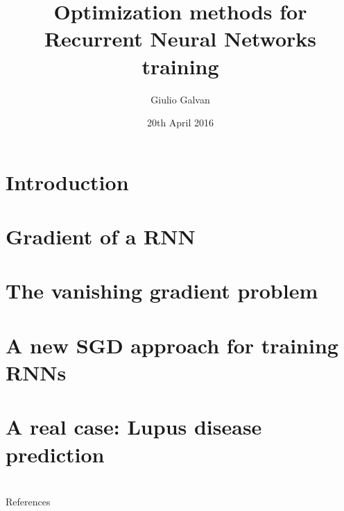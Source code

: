 \documentclass[xcolor=dvipsnames,10pt]{beamer}
\title{Optimization methods for Recurrent Neural Networks training}
\date{20th April 2016}
\author{Giulio Galvan}
\institute{Università degli studi di Firenze}
\begin{document}
\maketitle
\section{Introduction}

\section{Gradient of a RNN}

\section{The vanishing gradient problem}

%
\section{A new SGD approach for training RNNs}

\section{A real case: Lupus disease prediction}


\section{}
\begin{frame}[allowframebreaks]{References}
	
	
\end{frame}
\end{document}
